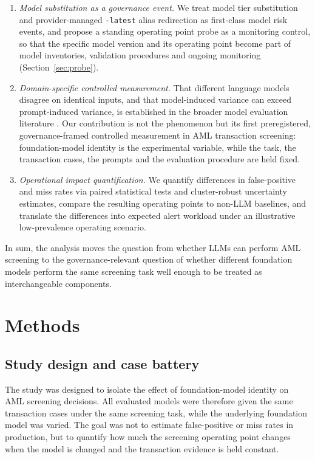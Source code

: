 \documentclass[pdflatex,sn-basic,Numbered]{sn-jnl}
\begin{document}
\begin{enumerate}
\item \emph{Model substitution as a governance event.} We treat model tier substitution and provider-managed \texttt{-latest} alias redirection as first-class model risk events, and propose a standing operating point probe as a monitoring control, so that the specific model version and its operating point become part of model inventories, validation procedures and ongoing monitoring (Section~\ref{sec:probe}).
\item \emph{Domain-specific controlled measurement.} That different language models disagree on identical inputs, and that model-induced variance can exceed prompt-induced variance, is established in the broader model evaluation literature \cite{helm,promptsens}. Our contribution is not the phenomenon but its first preregistered, governance-framed controlled measurement in AML transaction screening: foundation-model identity is the experimental variable, while the task, the transaction cases, the prompts and the evaluation procedure are held fixed.
\item \emph{Operational impact quantification.} We quantify differences in false-positive and miss rates via paired statistical tests and cluster-robust uncertainty estimates, compare the resulting operating points to non-LLM baselines, and translate the differences into expected alert workload under an illustrative low-prevalence operating scenario.
\end{enumerate}

In sum, the analysis moves the question from whether LLMs can perform AML screening to the governance-relevant question of whether different foundation models perform the same screening task well enough to be treated as interchangeable components.

\section{Methods}\label{sec:methods}

\subsection{Study design and case battery}

The study was designed to isolate the effect of foundation-model identity on AML screening decisions. All evaluated models were therefore given the same transaction cases under the same screening task, while the underlying foundation model was varied. The goal was not to estimate false-positive or miss rates in production, but to quantify how much the screening operating point changes when the model is changed and the transaction evidence is held constant.
\end{document}
